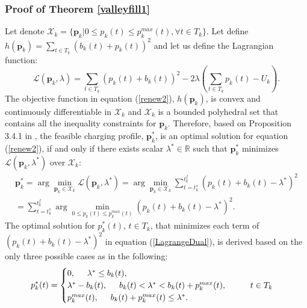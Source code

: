 \documentclass[12pt,draftcls,onecolumn]{IEEEtran}
\begin{document}
\subsubsection{Proof of Theorem \ref{valleyfill1}} \label{A3}
\indent Let denote $\mathcal{X}_k=\{\mathbf{p}_k| 0 \leq p_k(t) \leq p_k^{max}(t), \forall t \in T_k\}$. Let define $h(\mathbf{p}_k)=\sum_{t\in T_k}(b_k(t)+p_k(t))^2$ and let us define the Lagrangian function:
\begin{equation}
\mathcal{L}(\mathbf{p}_k, \lambda)=\sum_{t\in T_k}(p_k(t)+b_k(t))^2-2\lambda(\sum_{t\in T_k}p_k(t)-U_k).
\label{LagrangeThm3}
\end{equation}
\indent The objective function in equation (\ref{renew2}), $h(\mathbf{p}_k)$, is convex and continuously differentiable in $\mathcal{X}_k$ and $\mathcal{X}_k$ is a bounded polyhedral set that contains all the inequality constraints for $\mathbf{p}_k$. Therefore, based on Proposition 3.4.1 in \cite{B99}, the feasible charging profile, $\mathbf{p}^{*}_k$, is an optimal solution for equation (\ref{renew2}), if and only if there exists scalar $\lambda^* \in \mathbb{R}$ such that $\mathbf{p}_k^{*}$ minimizes $\mathcal{L}(\mathbf{p}_k, \lambda^*)$ over $\mathcal{X}_k$:
\begin{eqnarray}
\mathbf{p}_k^{*}=\arg\min_{\mathbf{p}_k \in \mathcal{X}_k}\mathcal{L}(\mathbf{p}_k, \lambda^{*})=\arg\min_{\mathbf{p}_k\in\mathcal{X}_k}\sum_{t=t_k^s}^{t_k^f} (p_k(t)+b_k(t) - \lambda^*)^2 \nonumber\\
=\sum_{t=t_k^s}^{t_k^f}\arg\min_{0 \leq p_k(t) \leq p_k^{max}(t)}(p_k(t)+b_k(t) - \lambda^*)^2.
\label{LagrangeDual}
\end{eqnarray}
\indent The optimal solution for $p_k^{*}(t)$, $t \in T_k$, that minimizes each term of $(p_k(t)+b_k(t) - \lambda^*)^2$ in equation (\ref{LagrangeDual}), is derived based on the only three possible cases as in the following:
\begin{eqnarray}
p^{*}_k(t)=
\begin{cases}
0,  \hspace{5mm} \lambda^* \leq b_k(t),\\
\lambda^* - b_k(t), \hspace{5mm} b_k(t) < \lambda^* < b_k(t) + p_k^{max}(t), \hspace{10mm} t \in T_k\\
p_k^{max}(t),   \hspace{5mm} b_k(t) + p_k^{max}(t) \leq \lambda^*.
\end{cases}
\label{lambdaThm3}
\end{eqnarray}
\end{document}
